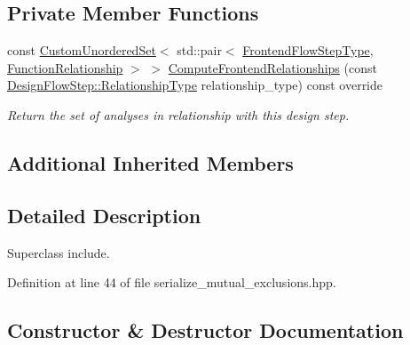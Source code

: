 \subsection*{Private Member Functions}
\begin{DoxyCompactItemize}
\item 
const \hyperlink{classCustomUnorderedSet}{Custom\+Unordered\+Set}$<$ std\+::pair$<$ \hyperlink{frontend__flow__step_8hpp_afeb3716c693d2b2e4ed3e6d04c3b63bb}{Frontend\+Flow\+Step\+Type}, \hyperlink{classFrontendFlowStep_af7cf30f2023e5b99e637dc2058289ab0}{Function\+Relationship} $>$ $>$ \hyperlink{classSerializeMutualExclusions_a254a59bffe9ecbe6b77f33934cf8dfbe}{Compute\+Frontend\+Relationships} (const \hyperlink{classDesignFlowStep_a723a3baf19ff2ceb77bc13e099d0b1b7}{Design\+Flow\+Step\+::\+Relationship\+Type} relationship\+\_\+type) const override
\begin{DoxyCompactList}\small\item\em Return the set of analyses in relationship with this design step. \end{DoxyCompactList}\end{DoxyCompactItemize}
\subsection*{Additional Inherited Members}


\subsection{Detailed Description}
Superclass include. 

Definition at line 44 of file serialize\+\_\+mutual\+\_\+exclusions.\+hpp.



\subsection{Constructor \& Destructor Documentation}
\mbox{\label{classSerializeMutualExclusions_ae189dcb417f9d833489fa67984427eaf}} 
